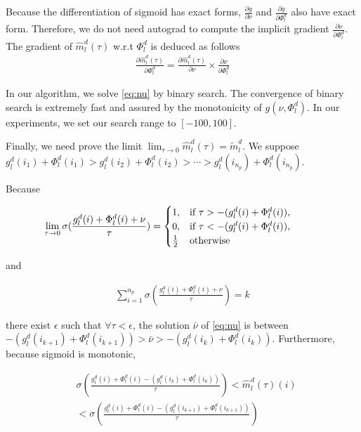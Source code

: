 \documentclass[11pt]{article}
\begin{document}
Because the differentiation of sigmoid has exact forms, $\frac{\partial g}{\partial \nu}$ and $\frac{\partial g}{\partial \Phi_l^d}$ also have exact form. Therefore, we do not need autograd to compute the implicit gradient $\frac{\partial \nu}{\partial \Phi_l^d}$. The gradient of $\hat{m}_l^d(\tau)$ w.r.t $\Phi_l^d$ is deduced as follows
\begin{align}
\frac{\partial \hat{m}_l^d(\tau)}{\partial \Phi_l^d} = \frac{\partial \hat{m}_l^d(\tau)}{\partial \nu} \times \frac{\partial \nu}{\partial \Phi_l^d}
\end{align}

In our algorithm, we solve \eqref{eq:nu} by binary search. The convergence of binary search is extremely fast and assured by the monotonicity of $g(\nu,\Phi_l^d)$. In our experiments, we set our search range to $[-100,100]$.

Finally, we need prove the limit $\lim_{\tau \rightarrow 0}\hat{m}_l^d(\tau) = \tilde{m}_l^d$. We suppose $g_l^d(i_1) + \Phi_l^d(i_1) > g_l^d(i_2) + \Phi_l^d(i_2) > \cdots > g_l^d(i_{n_p}) + \Phi_l^d(i_{n_p})$.

Because

\begin{align*}
\hspace{-3.em}
\lim_{\tau \rightarrow 0} \sigma(\frac{g_l^d(i) + \Phi_l^d(i) + \nu}{\tau}) = \begin{cases}
      1, & \text{if}\ \tau > - (g_l^d(i) + \Phi_l^d(i)), \\
      0, & \text{if}\ \tau < - (g_l^d(i) + \Phi_l^d(i)), \\
      \frac{1}{2} &\text{otherwise}\\
    \end{cases}
\end{align*}

and 

\begin{align*}
\displaystyle{\mathop{\sum}_{i=1}^{n_p}} \sigma(\frac{g_l^d(i) + \Phi_l^d(i) + \nu}{\tau}) = k
\end{align*}

there exist $\epsilon$ such that $\forall \tau < \epsilon$, the solution $\bar{\nu}$ of \eqref{eq:nu} is between $- (g_l^d(i_{k+1}) + \Phi_l^d(i_{k+1})) > \bar{\nu} > - (g_l^d(i_k) + \Phi_l^d(i_k))$. Furthermore, because sigmoid is monotonic,

\begin{align*}
&\sigma(\frac{g_l^d(i) + \Phi_l^d(i) - (g_l^d(i_{k}) + \Phi_l^d(i_{k}))}{\tau}) < \hat{m}_l^d(\tau)(i)  \\
& < \sigma(\frac{g_l^d(i) + \Phi_l^d(i) - (g_l^d(i_{k+1}) + \Phi_l^d(i_{k+1}))}{\tau}) 
\end{align*}
\end{document}
